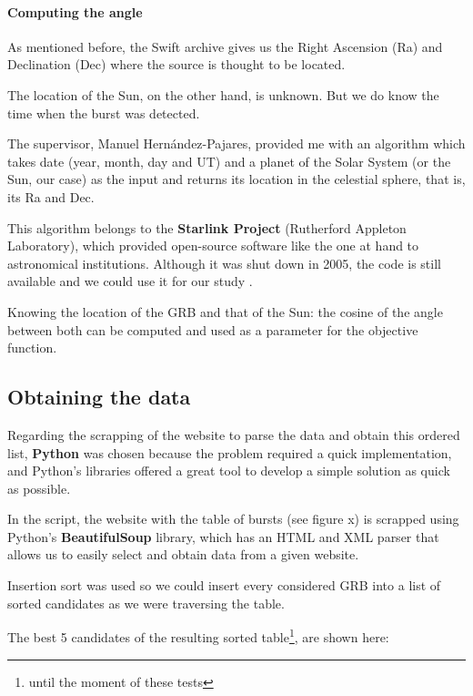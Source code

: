 \paragraph{Computing the angle}

As mentioned before, the Swift archive gives us the Right Ascension (Ra) and Declination (Dec) where the source is thought to be located.

The location of the Sun, on the other hand, is unknown. But we do know the time when the burst was detected.

The supervisor, Manuel Hernández-Pajares, provided me with an algorithm which takes date (year, month, day and UT) and a planet of the Solar System (or the Sun, our case) as the input and returns its location in the celestial sphere, that is, its Ra and Dec. 

This algorithm belongs to the \textbf{Starlink Project} (Rutherford Appleton Laboratory), which provided open-source software like the one at hand to astronomical institutions. Although it was shut down in 2005, the code is still available and we could use it for our study \cite{starlinkproject}.

Knowing the location of the GRB and that of the Sun: the cosine of the angle between both can be computed and used as a parameter for the objective function.

\subsection{Obtaining the data}

Regarding the scrapping of the website to parse the data and obtain this ordered list, \textbf{Python} was chosen because the problem required a quick implementation, and Python’s libraries offered a great tool to develop a simple solution as quick as possible.

In the script, the website with the table of bursts (see figure x) is scrapped using Python’s \textbf{BeautifulSoup} library, which has an HTML and XML parser that allows us to easily select and obtain data from a given website.

Insertion sort was used so we could insert every considered GRB into a list of sorted candidates as we were traversing the table. 

The best 5 candidates of the resulting sorted table\footnote{until the moment of these tests}, are shown here:

